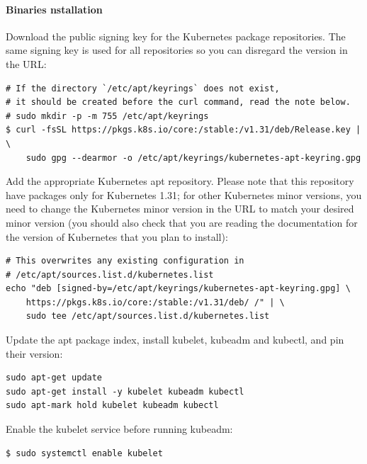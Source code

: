 \documentclass{article}
\newenvironment{codetemplate}[1][]{%
  \mybasecolorbox[#1]
  \itshape
}{%
  \endmybasecolorbox
}
\begin{document}
\paragraph{Binaries nstallation}
Download the public signing key for the Kubernetes package repositories. The same signing key is used for all repositories so you can disregard the version in the URL:
\begin{codetemplate}{}
\begin{verbatim}
# If the directory `/etc/apt/keyrings` does not exist, 
# it should be created before the curl command, read the note below.
# sudo mkdir -p -m 755 /etc/apt/keyrings
$ curl -fsSL https://pkgs.k8s.io/core:/stable:/v1.31/deb/Release.key | \
    sudo gpg --dearmor -o /etc/apt/keyrings/kubernetes-apt-keyring.gpg
\end{verbatim}
\end{codetemplate}

Add the appropriate Kubernetes apt repository. Please note that this repository have packages only for Kubernetes 1.31; for other Kubernetes minor versions, you need to change the Kubernetes minor version in the URL to match your desired minor version (you should also check that you are reading the documentation for the version of Kubernetes that you plan to install):
\begin{codetemplate}{}
\begin{verbatim}
# This overwrites any existing configuration in 
# /etc/apt/sources.list.d/kubernetes.list
echo "deb [signed-by=/etc/apt/keyrings/kubernetes-apt-keyring.gpg] \
    https://pkgs.k8s.io/core:/stable:/v1.31/deb/ /" | \
    sudo tee /etc/apt/sources.list.d/kubernetes.list
\end{verbatim}
\end{codetemplate}

Update the apt package index, install kubelet, kubeadm and kubectl, and pin their version:
\begin{codetemplate}{}
\begin{verbatim}
sudo apt-get update
sudo apt-get install -y kubelet kubeadm kubectl
sudo apt-mark hold kubelet kubeadm kubectl
\end{verbatim}
\end{codetemplate}

Enable the kubelet service before running kubeadm:
\begin{codetemplate}{}
\begin{verbatim}
$ sudo systemctl enable kubelet
\end{verbatim}
\end{codetemplate}
\end{document}

